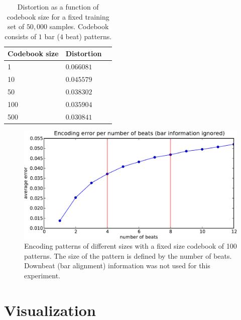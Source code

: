 \documentclass{article}
\begin{document}
\begin{table}
\begin{center}
\begin{tabular}{llc}
\toprule
Codebook size & Distortion \\
\midrule
1 & $0.066081$ \\
10 & $0.045579$ \\
50 & $0.038302$ \\
100 & $0.035904$ \\
500 & $0.030841$ \\
\bottomrule
\end{tabular}
\end{center}
\caption{\small{Distortion as a function of codebook size for a fixed training set 
of $50,000$ samples.  Codebook consists of $1$ bar ($4$ beat) patterns.
  }}
\label{tab:cbsize}
\end{table}


\begin{figure}[b]
\begin{center}
\includegraphics[width=.8\columnwidth]{encoding_per_beat}
\end{center}
\caption{\small{Encoding patterns of different sizes with a fixed size
codebook of 100 patterns. The size of the pattern is defined by the number of beats. 
Downbeat (bar alignment) information was not used for this experiment. %
}}
\label{fig:perbeat}
\end{figure}


\section{Visualization} \label{sec:visu}
\end{document}

